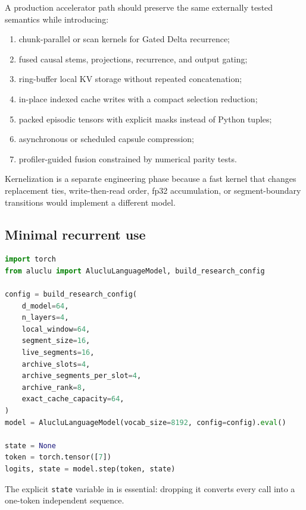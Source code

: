 A production accelerator path should preserve the same externally tested
semantics while introducing:

\begin{enumerate}
  \item chunk-parallel or scan kernels for Gated Delta recurrence;
  \item fused causal stems, projections, recurrence, and output gating;
  \item ring-buffer local KV storage without repeated concatenation;
  \item in-place indexed cache writes with a compact selection reduction;
  \item packed episodic tensors with explicit masks instead of Python tuples;
  \item asynchronous or scheduled capsule compression;
  \item profiler-guided fusion constrained by numerical parity tests.
\end{enumerate}

Kernelization is a separate engineering phase because a fast kernel that
changes replacement ties, write-then-read order, fp32 accumulation, or
segment-boundary transitions would implement a different model.

\subsection{Minimal recurrent use}

\begin{lstlisting}[language=Python,caption={One-token recurrent inference.},
label={lst:minimal-step}]
import torch
from aluclu import AlucluLanguageModel, build_research_config

config = build_research_config(
    d_model=64,
    n_layers=4,
    local_window=64,
    segment_size=16,
    live_segments=16,
    archive_slots=4,
    archive_segments_per_slot=4,
    archive_rank=8,
    exact_cache_capacity=64,
)
model = AlucluLanguageModel(vocab_size=8192, config=config).eval()

state = None
token = torch.tensor([7])
logits, state = model.step(token, state)
\end{lstlisting}

The explicit \texttt{state} variable in  is essential:
dropping it converts every call into a one-token independent sequence.
